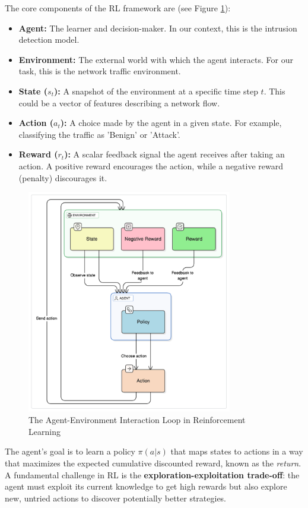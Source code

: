 \documentclass{report}
\begin{document}
The core components of the RL framework are (see Figure \ref{fig:rl-diagram}):
\begin{itemize}
    \item \textbf{Agent:} The learner and decision-maker. In our context, this is the intrusion detection model.
    \item \textbf{Environment:} The external world with which the agent interacts. For our task, this is the network traffic environment.
    \item \textbf{State ($s_t$):} A snapshot of the environment at a specific time step $t$. This could be a vector of features describing a network flow.
    \item \textbf{Action ($a_t$):} A choice made by the agent in a given state. For example, classifying the traffic as 'Benign' or 'Attack'.
    \item \textbf{Reward ($r_t$):} A scalar feedback signal the agent receives after taking an action. A positive reward encourages the action, while a negative reward (penalty) discourages it.
\end{itemize}

\begin{figure}[H]
    \centering
    \includegraphics[width=0.8\textwidth]{images/rl-diagram.png}
    \caption{The Agent-Environment Interaction Loop in Reinforcement Learning}
    \label{fig:rl-diagram}
\end{figure}

The agent's goal is to learn a policy $\pi(a|s)$ that maps states to actions in a way that maximizes the expected cumulative discounted reward, known as the \textit{return}. A fundamental challenge in RL is the \textbf{exploration-exploitation trade-off}: the agent must exploit its current knowledge to get high rewards but also explore new, untried actions to discover potentially better strategies.
\end{document}
